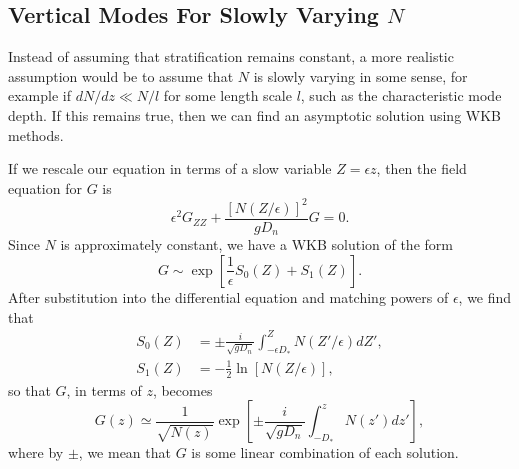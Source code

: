 \documentclass[11pt]{article}
\begin{document}

\subsection{Vertical Modes For Slowly Varying $N$}

Instead of assuming that stratification remains constant, a more realistic assumption would be to assume that $N$ is slowly varying in some sense, for example if $dN/dz \ll N/l$ for some length scale $l$, such as the characteristic mode depth. If this remains true, then we can find an asymptotic solution using WKB methods.

If we rescale our equation in terms of a slow variable $Z = \epsilon z$, then the field equation for $G$ is
\begin{equation}
\epsilon^2 G_{ZZ} + \frac{\left[{N(Z/\epsilon)}\right]^2}{g D_n} G = 0.
\end{equation}
Since $N$ is approximately constant, we have a WKB solution of the form
\begin{equation*}
G \sim \exp\left[\frac{1}{\epsilon} S_0(Z) + S_1(Z) \right].
\end{equation*}
After substitution into the differential equation and matching powers of $\epsilon$, we find that
\begin{subequations}
\begin{align}
S_0(Z) &= \pm \frac{i}{\sqrt{g D_n}} \int_{-\epsilon D_*}^{Z} N(Z'/\epsilon) dZ', \\
S_1(Z) &= -\frac{1}{2} \ln \left[N(Z/\epsilon)\right],
\end{align}
\end{subequations}
so that $G$, in terms of $z$, becomes
\begin{equation*}
G(z) \simeq \frac{1}{\sqrt{N(z)}} \exp \left[\pm \frac{i}{\sqrt{g D_n}} \int_{-D_*}^{z} N(z') dz' \right],
\end{equation*}
where by $\pm$, we mean that $G$ is some linear combination of each solution.
\end{document}
